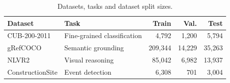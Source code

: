 \begin{table}[H]
\centering
\caption{Datasets, tasks and dataset split sizes.}
\label{tab:data}
\fontsize{9}{10.8}\selectfont
\setlength{\tabcolsep}{1.2pt}
\begin{tabularx}{\columnwidth}{@{}l>{\raggedright\arraybackslash}Xrrr@{}}
\toprule
\rowcolor{valfill} Dataset & Task & Train & Val. & Test\\
\midrule
CUB-200-2011 & Fine-grained classification & 4,792 & 1,200 & 5,794\\
gRefCOCO & Semantic grounding & 209,344 & 14,229 & 35,263\\
NLVR2 & Visual reasoning & 85,042 & 6,982 & 13,937\\
ConstructionSite & Event detection & 6,308 & 701 & 3,004\\
\bottomrule
\end{tabularx}
\end{table}
